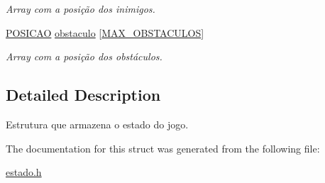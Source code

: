 \begin{DoxyCompactItemize}
\begin{DoxyCompactList}\small\item\em Array com a posição dos inimigos. \end{DoxyCompactList}\item 
\hyperlink{estado_8h_a55b3f4b56938eeb8fa5e8f9c07baf1b0}{P\+O\+S\+I\+C\+AO} \hyperlink{structestado_a970dc20c6687acb17c3f08c06edbed4f}{obstaculo} \mbox{[}\hyperlink{estado_8h_ac574e2817856ecc9a890d2d47cb9d783}{M\+A\+X\+\_\+\+O\+B\+S\+T\+A\+C\+U\+L\+OS}\mbox{]}\hypertarget{structestado_a970dc20c6687acb17c3f08c06edbed4f}{}\label{structestado_a970dc20c6687acb17c3f08c06edbed4f}

\begin{DoxyCompactList}\small\item\em Array com a posição dos obstáculos. \end{DoxyCompactList}\end{DoxyCompactItemize}


\subsection{Detailed Description}
Estrutura que armazena o estado do jogo. 

The documentation for this struct was generated from the following file\+:\begin{DoxyCompactItemize}
\item 
\hyperlink{estado_8h}{estado.\+h}\end{DoxyCompactItemize}
